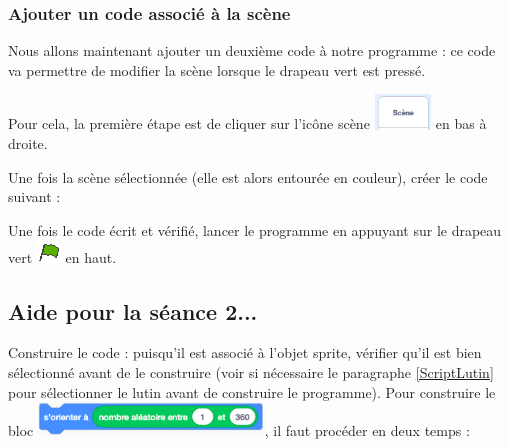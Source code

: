 \subsubsection{Ajouter un code associé à la scène}

Nous allons maintenant ajouter un deuxième code à notre programme : ce code va permettre de modifier la scène lorsque le drapeau vert est pressé. 

Pour cela, la première étape est de cliquer sur l'icône scène \includegraphics[width=1.5cm]{./images/scratch/scene0.png} en bas à droite.


Une fois la scène sélectionnée (elle est alors entourée en couleur), créer le code suivant :


Une fois le code écrit et vérifié, lancer le programme en appuyant sur le drapeau vert \includegraphics[width=.7cm]{./images/scratch/DrapeauVert} en haut. 








%
%
%
%









\subsection{Aide pour la séance 2...}\label{correction_scratch2}


Construire le code : puisqu'il est associé à l'objet sprite, vérifier qu'il est bien sélectionné avant de le construire (voir si nécessaire le paragraphe \vref{ScriptLutin} pour sélectionner le lutin avant de construire le programme). Pour construire le bloc \includegraphics[width=6cm]{./images/scratch/scratchActivite2_0.png}, il faut procéder en deux temps :

